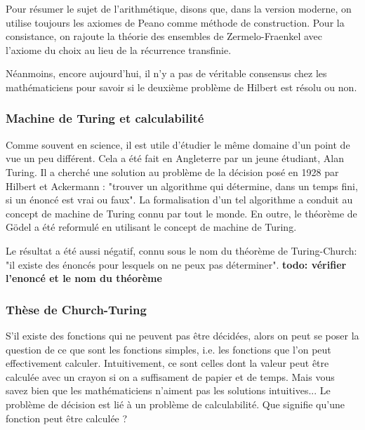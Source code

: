 \documentclass[12pt, a4paper]{article}
\begin{document}

Pour résumer le sujet de l'arithmétique, disons que, dans la version moderne, on utilise toujours les axiomes de Peano comme méthode de construction.
Pour la consistance, on rajoute la théorie des ensembles de Zermelo-Fraenkel avec l'axiome du choix au lieu de la récurrence transfinie.

Néanmoins, encore aujourd'hui, il n'y a pas de véritable consensus chez les mathématiciens pour savoir si le deuxième problème de Hilbert est résolu ou non.

\subsubsection*{Machine de Turing et calculabilité}
Comme souvent en science, il est utile d'étudier le même domaine d'un point de vue un peu différent. Cela a été fait en Angleterre par un jeune étudiant, Alan Turing. Il a cherché une solution au problème de la décision posé en 1928 par Hilbert et Ackermann : "trouver un algorithme qui détermine, dans un temps fini, si un énoncé est vrai ou faux". La formalisation d'un tel algorithme a conduit au concept de machine de Turing connu par tout le monde. En outre, le théorème de Gödel a été reformulé en utilisant le concept de machine de Turing.

Le résultat a été aussi négatif, connu sous le nom du théorème de Turing-Church: "il existe des énoncés pour lesquels on ne peux pas déterminer".
\textbf{todo: vérifier l'enoncé et le nom du théorème}

\subsubsection*{Thèse de Church-Turing}
S'il existe des fonctions qui ne peuvent pas être décidées, alors on peut se poser la question de ce que sont les fonctions simples, i.e. les fonctions que l'on peut effectivement calculer.
Intuitivement, ce sont celles dont la valeur peut être calculée avec un crayon si on a suffisament de papier et de temps.
Mais vous savez bien que les mathématiciens n'aiment pas les solutions intuitives...
Le problème de décision est lié à un problème de calculabilité. Que signifie qu'une fonction peut être calculée ?
\end{document}
